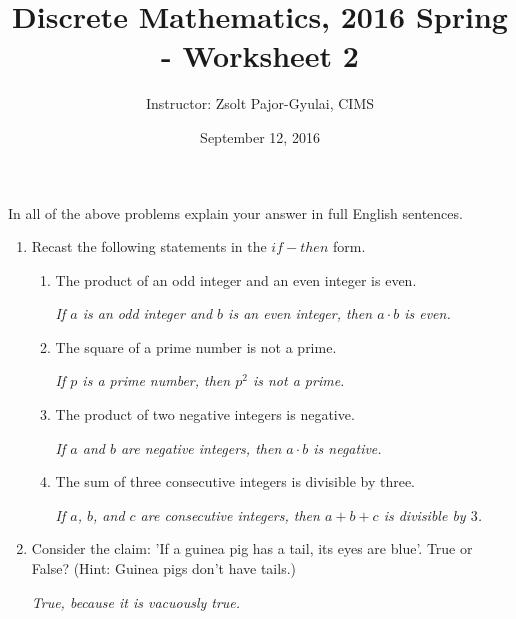 \documentclass[11pt]{preprint}
\title{Discrete Mathematics, 2016 Spring - Worksheet 2}
\author{Instructor: Zsolt Pajor-Gyulai, CIMS}
\date{September 12, 2016}
\begin{document}
\maketitle

In all of the above problems explain your answer in full English sentences.

\begin{enumerate}
\item Recast the following statements in the $if-then$ form.
\begin{enumerate}
\item The product of an odd integer and an even integer is even.

\vspace{0.1cm}
\textit{If $a$ is an odd integer and $b$ is an even integer, then $a\cdot b$ is even.}
\vspace{0.1cm}

\item The square of a prime number is not a prime.

\vspace{0.1cm}
\textit{If $p$ is a prime number, then $p^2$ is not a prime.}
\vspace{0.1cm}

\item The product of two negative integers is negative.

\vspace{0.1cm}
\textit{If $a$ and $b$ are negative integers, then $a\cdot b$ is negative.}
\vspace{0.1cm}

\item The sum of three consecutive integers is divisible by three.

\vspace{0.1cm}
\textit{If $a$, $b$, and $c$ are consecutive integers, then $a+b+c$ is divisible by $3$.}
\vspace{0.1cm}

\end{enumerate}


\item Consider the claim: 'If a guinea pig has a tail, its eyes are blue'. True or False? (Hint: Guinea pigs don't have tails.)

\vspace{0.1cm}
\textit{True, because it is vacuously true.}
\vspace{0.1cm}


\end{enumerate}
\end{document}

